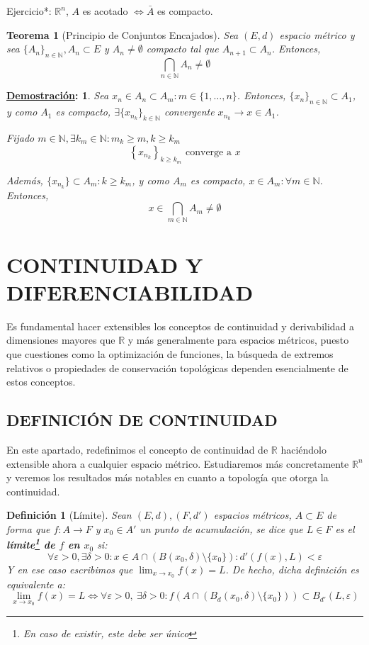 \documentclass[10pt,a4paper,openright]{book}
\theoremstyle{break}
\newtheorem*{defi}{Definición}
\newtheorem*{theo}{Teorema}
\newtheorem*{demo}{\underline{Demostración}:}
\begin{document}
Ejercicio*:  $\mathbb{R}^n$, $A$ es acotado $\Leftrightarrow \bar{A}$ es compacto.

\begin{theo}[Principio de Conjuntos Encajados]
Sea $(E,d)$ espacio métrico y sea $\{A_n\}_{n \in \mathbb{N}}, A_n \subset E$ y $A_n \neq \emptyset$ compacto tal que $A_{n+1} \subset A_n$. Entonces, $$\bigcap_{n \in \mathbb{N}} A_n \neq \emptyset$$ 
\end{theo}

\begin{demo}
Sea $x_n \in A_n \subset A_m : m \in \{1,\ldots,n\}$. Entonces, $\{x_n\}_{n \in \mathbb{N}} \subset A_1$, y como $A_1$ es compacto, $\exists \{x_{n_k}\}_{k \in \mathbb{N}}$ convergente $x_{n_k} \to x \in A_1$.

Fijado $m \in \mathbb{N}, \exists k_m \in \mathbb{N} : m_k \geq m, k \geq k_m$
$$\left\lbrace x_{n_k} \right\rbrace_{k \geq k_m} \mbox{ converge a } x$$

Además, $\{x_{n_k}\} \subset A_m : k \geq k_m$, y como $A_m$  es compacto, $x \in A_m : \forall m \in \mathbb{N}$. Entonces, $$x \in \bigcap_{m \in \mathbb{N}} A_m \neq \emptyset$$
\end{demo}

\chapter*{CONTINUIDAD Y \\ DIFERENCIABILIDAD}
Es fundamental hacer extensibles los conceptos de continuidad y derivabilidad a dimensiones mayores que $\mathbb{R}$ y más generalmente para espacios métricos, puesto que cuestiones como la optimización de funciones, la búsqueda de extremos relativos o propiedades de conservación topológicas dependen esencialmente de estos conceptos.

\section*{DEFINICIÓN DE CONTINUIDAD}
En este apartado, redefinimos el concepto de continuidad de $\mathbb{R}$ haciéndolo extensible ahora a cualquier espacio métrico. Estudiaremos más concretamente $\mathbb{R}^n$ y veremos los resultados más notables en cuanto a topología que otorga la continuidad.

\begin{defi}[Límite]
Sean $(E,d),(F,d')$ espacios métricos, $A\subset E$ de forma que $f:A \to F$ y $x_0 \in A'$ un punto de acumulación, se dice que $L \in F$ es el \textbf{límite\footnote{En caso de existir, este debe ser único} de $f$ en $x_0$} si:
$$\forall \varepsilon > 0, \exists \delta > 0 : x \in A \cap (B(x_0, \delta) \setminus \{x_0\}) : d'(f(x), L) < \varepsilon$$
Y en ese caso escribimos que $ \displaystyle\lim_{x \to x_0} f(x) = L$. De hecho, dicha definición es equivalente a:
$$\lim_{x \to x_0} f(x) = L \Leftrightarrow \forall \varepsilon > 0,\ \exists \delta > 0 : f(A \cap (B_d(x_0, \delta) \setminus \{x_0\})) \subset B_{d'}(L, \varepsilon)$$
\end{defi}
\end{document}

